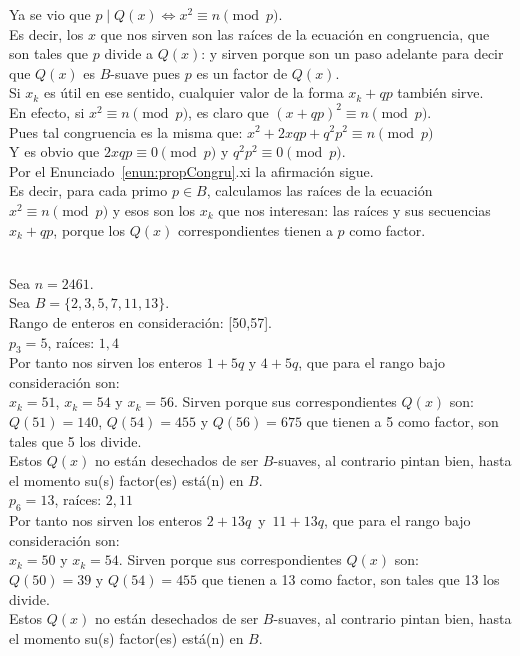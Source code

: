 Ya se vio que $p \mid Q(x) \iff x^2 \equiv n \pmod p$. \\
Es decir, los $x$ que nos sirven son las raíces de la ecuación en congruencia, que son tales que $p$ divide a $Q(x)$: y sirven porque son un paso adelante para decir que $Q(x)$ es $B$-suave pues $p$ es un factor de $Q(x)$. \\
Si $x_k$ es útil en ese sentido, cualquier valor de la forma $x_k + qp$ también sirve. \\
En efecto, si $x^2 \equiv n \pmod p$, es claro que $(x+qp)^2 \equiv n \pmod p$. \\
Pues tal congruencia es la misma que: $x^2+2xqp+q^2p^2 \equiv n \pmod p$\\
Y es obvio que $2xqp \equiv 0 \pmod p$ y $q^2p^2 \equiv 0 \pmod p$. \\
Por el Enunciado~\ref{enun:propCongru}.xi la afirmación sigue. \\

Es decir, para cada primo $p \in B$, calculamos las raíces de la ecuación $ x^2 \equiv n \pmod p$ y esos son los $x_k$ que nos interesan: las raíces y sus secuencias $x_k+qp$, porque los $Q(x)$ correspondientes tienen a $p$ como factor.  \\

\begin{ejemplo} \, \\
Sea $n = 2461$. \\
Sea $B = \{2, 3, 5, 7, 11,13\}$. \\
Rango de enteros en consideración: [50,57]. \\ 
$p_3= 5$, raíces: $1,4$ \\
Por tanto nos sirven los enteros $1+5q$ y $4+5q$, que para el rango bajo consideración son: \\
$x_k=51$, $x_k=54$ y $x_k=56$.
Sirven porque sus correspondientes $Q(x)$ son: \\
$Q(51)=140$, $Q(54)=455$ y $Q(56)=675$ que tienen a 5 como factor, son tales que 5 los divide. \\
Estos $Q(x)$ no están desechados de ser $B$-suaves, al contrario pintan bien, hasta el momento su(s) factor(es) está(n) en $B$. \\ 
$p_6= 13$, raíces: $2,11$ \\
Por tanto nos sirven los enteros $2+13q \,$ y $\, 11+13q$, que para el rango bajo consideración son: \\
$x_k=50$ y $x_k=54$.
Sirven porque sus correspondientes $Q(x)$ son: \\
$Q(50)=39$ y $Q(54)=455$ que tienen a 13 como factor, son tales que 13 los divide. \\
Estos $Q(x)$ no están desechados de ser $B$-suaves, al contrario pintan bien, hasta el momento su(s) factor(es) está(n) en $B$. \\
\end{ejemplo} 

